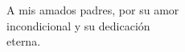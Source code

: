 \begin{dedication}
    A mis amados padres, por su amor\\
    incondicional y su dedicación \\
    eterna.
\end{dedication}
